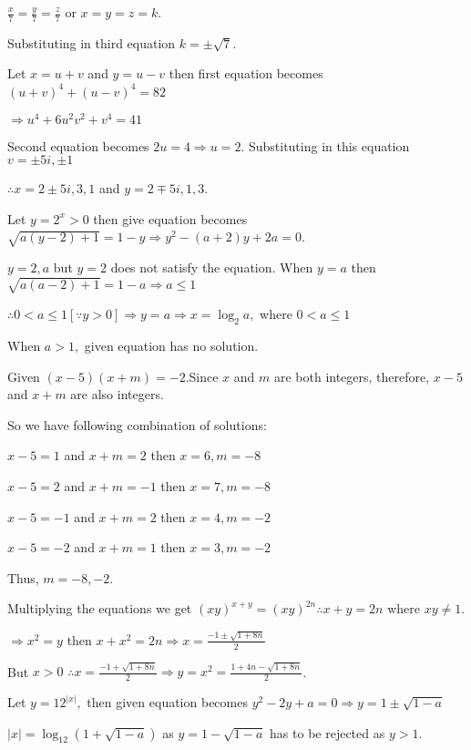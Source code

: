   $\frac{x}{7} = \frac{y}{7} = \frac{z}{7}$ or $x = y = z = k$.

  Substituting in third equation $k = \pm \sqrt{7}$.
\item Let $x = u + v$ and $y = u - v$ then first equation becomes $(u + v)^4 + (u - v)^4 = 82$

  $\Rightarrow u^4 + 6u^2v^2 + v^4 = 41$

  Second equation becomes $2u = 4 \Rightarrow u = 2$. Substituting in this equation $v = \pm 5i, \pm 1$

  $\therefore x = 2 \pm 5i, 3, 1$ and $y = 2\mp 5i, 1, 3$.
\item Let $y = 2^x > 0$ then give equation becomes $\sqrt{a(y - 2) + 1} = 1 - y\Rightarrow y^2 - (a + 2)y +
  2a = 0$.

  $y = 2, a$ but $y = 2$ does not satisfy the equation. When $y = a$ then $\sqrt{a(a - 2) + 1} = 1 - a
  \Rightarrow a \le 1$

  $\therefore 0 < a \le 1 [\because y > 0]\Rightarrow y = a \Rightarrow x =\log_2 a,$ where $0 < a \le 1$

  When $a > 1,$ given equation has no solution.
\item Given $(x - 5)(x + m) = -2$.Since $x$ and $m$ are both integers, therefore, $x - 5$ and $x + m$ are
  also integers.

  So we have following combination of solutions:

  $x - 5 = 1$ and $x + m = 2$ then $x = 6, m = -8$

  $x - 5 = 2$ and $x + m = -1$ then $x = 7, m = -8$

  $x - 5 = -1$ and $x + m = 2$ then $x = 4, m = -2$

  $x - 5 = -2$ and $x + m = 1$ then $x = 3, m = -2$

  Thus, $m = -8, -2$.
\item Multiplying the equations we get $(xy)^{x + y} = (xy)^{2n} \therefore x + y = 2n$ where $xy \ne 1$.

  $\Rightarrow x^2 = y$ then $x + x^2 = 2n\Rightarrow x = \frac{-1 \pm \sqrt{1 + 8n}}{2}$

  But $x > 0$ $\therefore x = \frac{-1 + \sqrt{1 + 8n}}{2}\Rightarrow y = x^2 = \frac{1 + 4n - \sqrt{1 +
      8n}}{2}$.
\item Let $y = 12^{|x|},$ then given equation becomes $y^2 - 2y + a = 0\Rightarrow y = 1 \pm \sqrt{1 - a}$

  $|x| = \log_{12}(1 + \sqrt{1 - a})$ as $y = 1 - \sqrt{1 - a}$ has to be rejected as $y > 1$.

